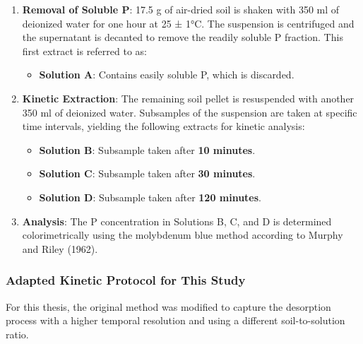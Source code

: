 \documentclass[
  a4paper,
]{article}
\providecommand{\tightlist}{%
  \setlength{\itemsep}{0pt}\setlength{\parskip}{0pt}}
\begin{document}
\begin{enumerate}
\def\labelenumi{\arabic{enumi}.}
\tightlist
\item
  \textbf{Removal of Soluble P}: 17.5 g of air-dried soil is shaken with
  350 ml of deionized water for one hour at 25 ± 1°C. The suspension is
  centrifuged and the supernatant is decanted to remove the readily
  soluble P fraction. This first extract is referred to as:

  \begin{itemize}
  \tightlist
  \item
    \textbf{Solution A}: Contains easily soluble P, which is discarded.
  \end{itemize}
\item
  \textbf{Kinetic Extraction}: The remaining soil pellet is resuspended
  with another 350 ml of deionized water. Subsamples of the suspension
  are taken at specific time intervals, yielding the following extracts
  for kinetic analysis:

  \begin{itemize}
  \tightlist
  \item
    \textbf{Solution B}: Subsample taken after \textbf{10 minutes}.
  \item
    \textbf{Solution C}: Subsample taken after \textbf{30 minutes}.
  \item
    \textbf{Solution D}: Subsample taken after \textbf{120 minutes}.
  \end{itemize}
\item
  \textbf{Analysis}: The P concentration in Solutions B, C, and D is
  determined colorimetrically using the molybdenum blue method according
  to Murphy and Riley (1962).
\end{enumerate}

\subsubsection{Adapted Kinetic Protocol for This
Study}\label{sec-adapted-kinetic-protocol-for-this-study}

For this thesis, the original method was modified to capture the
desorption process with a higher temporal resolution and using a
different soil-to-solution ratio.
\end{document}
